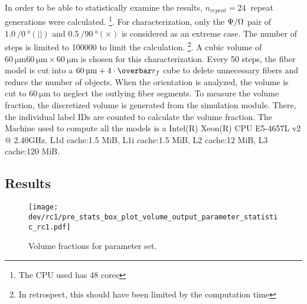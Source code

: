 % 
In order to be able to statistically examine the results, $n_{\mathit{repeat}} = \SI{24}{}$ repeat generations were calculated. \footnote{The CPU used has 48 cores}.
For characterization, only the $\textnormal{$\Psi$}/\textnormal{$\Omega$}$ pair of $\SI{1.0}{}/\SI{0}{\degree}(||)$ and $\SI{0.5}{}/\SI{90}{\degree}(\times)$ is considered as an extreme case.
The number of steps is limited to \SI{100000}{} to limit the calculation. \footnote{In retrospect, this should have been limited by the computation time}.
A cubic volume of $\SI{60}{\micro\meter} \SI{60}{\micro\meter} \times \SI{60}{\micro\meter}$ is chosen for this characterization.
Every 50 steps, the fiber model is cut into a $\SI{60}{\micro\meter}+4 \cdot \fiberRadiusMean$ cube to delete unnecessary fibers and reduce the number of objects.
When the orientation is analyzed, the volume is cut to $\SI{60}{\micro\meter}$ to neglect the outlying fiber segments.
To measure the volume fraction, the discretized volume is generated from the simulation module.
There, the individual label IDs are counted to calculate the volume fraction.
% 
The Machine used to compute all the models is a 
Intel(R) Xeon(R) CPU E5-4657L v2 @ 2.40GHz, L1d cache:1.5 MiB, L1i cache:1.5 MiB, L2 cache:12 MiB, L3 cache:120 MiB.
% 
% 
% 
\subsection{Results}
% 
\begin{figure}[p]
\centering
\texttt{[image: dev/rc1/pre\_stats\_box\_plot\_volume\_output\_parameter\_statistic\_rc1.pdf]}
\caption[Volume fraction]{Volume fractions for parameter set.}
\label{fig:psbp1}
\end{figure}
% 
